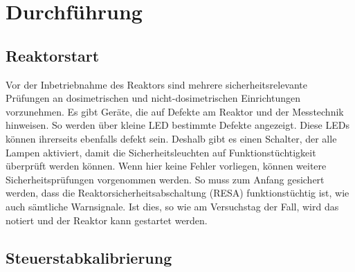 \section{Durchführung}
    \subsection{Reaktorstart}
    Vor der Inbetriebnahme des Reaktors sind mehrere sicherheitsrelevante Prüfungen an dosimetrischen und nicht-dosimetrischen Einrichtungen vorzunehmen. Es gibt Geräte, die auf Defekte am Reaktor und der Messtechnik hinweisen. So werden über kleine LED bestimmte Defekte angezeigt. Diese LEDs können ihrerseits ebenfalls defekt sein. Deshalb gibt es einen Schalter, der alle Lampen aktiviert, damit die Sicherheitsleuchten auf Funktionstüchtigkeit überprüft werden können. 
    Wenn hier keine Fehler vorliegen, können  weitere Sicherheitsprüfungen vorgenommen werden. So muss zum Anfang gesichert werden, dass die Reaktorsicherheitsabschaltung (\glqq RESA\grqq) funktionstüchtig ist, wie auch sämtliche Warnsignale. Ist dies, so wie am Versuchstag der Fall, wird das notiert und der Reaktor kann gestartet werden.
    
    \subsection{Steuerstabkalibrierung}

